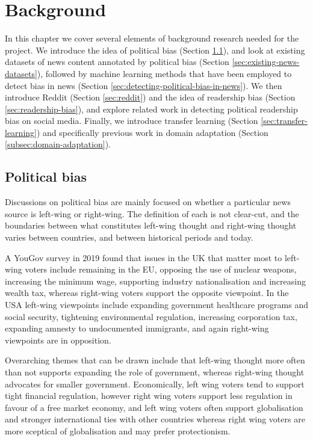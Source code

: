 \chapter{Background}

In this chapter we cover several elements of background research needed for the project. We introduce the idea of political bias (Section \ref{sec:political-bias}), and look at existing datasets of news content annotated by political bias (Section \ref{sec:existing-news-datasets}), followed by machine learning methods that have been employed to detect bias in news (Section \ref{sec:detecting-political-bias-in-news}). We then introduce Reddit (Section \ref{sec:reddit}) and the idea of readership bias (Section \ref{sec:readership-bias}), and explore related work in detecting political readership bias on social media. Finally, we introduce transfer learning (Section \ref{sec:transfer-learning}) and specifically previous work in domain adaptation (Section \ref{subsec:domain-adaptation}).

\section{Political bias} \label{sec:political-bias}

Discussions on political bias are mainly focused on whether a particular news source is left-wing or right-wing. The definition of each is not clear-cut, and the boundaries between what constitutes left-wing thought and right-wing thought varies between countries, and between historical periods and today.

A YouGov survey \cite{yougov} in 2019 found that issues in the UK that matter most to left-wing voters include remaining in the EU, opposing the use of nuclear weapons, increasing the minimum wage, supporting industry nationalisation and increasing wealth tax, whereas right-wing voters support the opposite viewpoint. In the USA \cite{diffen} left-wing viewpoints include expanding government healthcare programs and social security, tightening environmental regulation, increasing corporation tax, expanding amnesty to undocumented immigrants, and again right-wing viewpoints are in opposition.

Overarching themes that can be drawn include that left-wing thought more often than not supports expanding the role of government, whereas right-wing thought advocates for smaller government. Economically, left wing voters tend to support tight financial regulation, however right wing voters support less regulation in favour of a free market economy, and left wing voters often support globalisation and stronger international ties with other countries whereas right wing voters are more sceptical of globalisation and may prefer protectionism.

